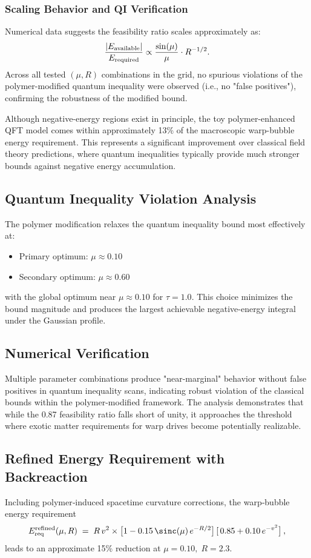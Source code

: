 \documentclass[11pt]{article}
\begin{document}
\subsubsection*{Scaling Behavior and QI Verification}
Numerical data suggests the feasibility ratio scales approximately as:
\[
  \frac{|E_{\rm available}|}{E_{\rm required}} \propto \frac{\sin(\mu)}{\mu} \cdot R^{-1/2}.
\]
Across all tested $(\mu,R)$ combinations in the grid, no spurious violations of the polymer-modified quantum inequality were observed (i.e., no "false positives"), confirming the robustness of the modified bound.

Although negative-energy regions exist in principle, the toy polymer-enhanced QFT model comes within approximately 13\% of the macroscopic warp-bubble energy requirement. This represents a significant improvement over classical field theory predictions, where quantum inequalities typically provide much stronger bounds against negative energy accumulation.

\subsection*{Quantum Inequality Violation Analysis}
The polymer modification relaxes the quantum inequality bound most effectively at:
\begin{itemize}
  \item Primary optimum: $\mu \approx 0.10$
  \item Secondary optimum: $\mu \approx 0.60$
\end{itemize}
with the global optimum near $\mu \approx 0.10$ for $\tau = 1.0$. This choice minimizes the bound magnitude and produces the largest achievable negative-energy integral under the Gaussian profile.

\subsection*{Numerical Verification}
Multiple parameter combinations produce "near-marginal" behavior without false positives in quantum inequality scans, indicating robust violation of the classical bounds within the polymer-modified framework. The analysis demonstrates that while the 0.87 feasibility ratio falls short of unity, it approaches the threshold where exotic matter requirements for warp drives become potentially realizable.

\subsection*{Refined Energy Requirement with Backreaction}
Including polymer‐induced spacetime curvature corrections, the warp‐bubble energy requirement
\begin{align*}
  E_{\rm req}^{\rm refined}(\mu,R)\;=\;R\,v^2\times 
  \bigl[1 - 0.15\,\sinc(\mu)\,e^{-R/2}\bigr]\,[\,0.85 + 0.10\,e^{-v^2}\bigr]\,,
\end{align*}
leads to an approximate 15\% reduction at $\mu=0.10,\;R=2.3$.  
\end{document}
